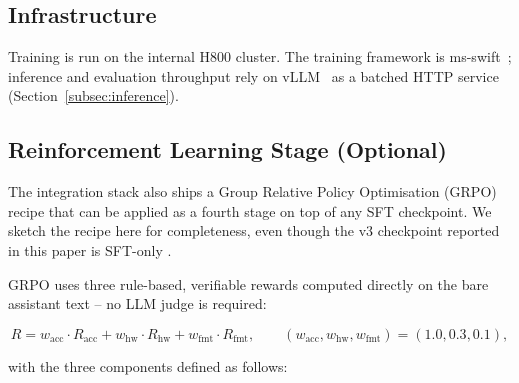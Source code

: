 \subsection{Infrastructure}

Training is run on the internal H800 cluster.
The training framework is ms-swift~\cite{msswift}; inference and
evaluation throughput rely on vLLM~\cite{kwon2023vllm} as a batched
HTTP service (Section~\ref{subsec:inference}).

\subsection{Reinforcement Learning Stage (Optional)}
\label{subsec:grpo}

The integration stack also ships a Group Relative Policy Optimisation
(GRPO) recipe that can be applied as a fourth stage on top of any
SFT checkpoint. We sketch the recipe here for completeness, even
though the v3 checkpoint reported in this paper is SFT-only
.

GRPO uses three rule-based, verifiable rewards computed directly on
the bare assistant text -- no LLM judge is required:

\begin{equation}
  R = w_\text{acc}\cdot R_\text{acc}
    + w_\text{hw} \cdot R_\text{hw}
    + w_\text{fmt}\cdot R_\text{fmt},
  \qquad (w_\text{acc}, w_\text{hw}, w_\text{fmt}) = (1.0, 0.3, 0.1),
  \label{eq:grpo-reward}
\end{equation}

with the three components defined as follows:

